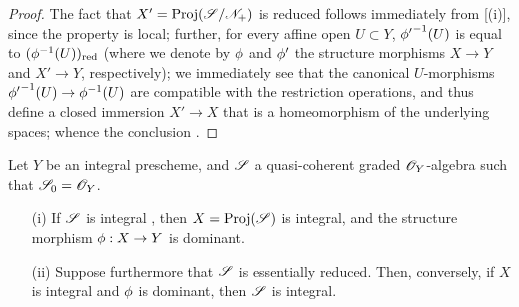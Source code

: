 \begin{proof}
The fact that $X'={\mathop{\mathrm{Proj}}\nolimits}(\mathscr{S}/\mathscr{N}_+)$ is reduced follows immediately from [(i)], since the property is local;
further, for every affine open $U\subset Y$, ${\phi'}^{-1}(U)$ is equal to $(\phi^{-1}(U))_{\mathrm{red}}$ (where we denote by $\phi$ and $\phi'$ the structure morphisms $X\to Y$ and $X'\to Y$, respectively);
we immediately see that the canonical $U$-morphisms ${\vphi'}^{-1}(U)\to\vphi^{-1}(U)$ are compatible with the restriction operations, and thus define a closed immersion $X'\to X$ that is a homeomorphism of the underlying spaces;
whence the conclusion .
\end{proof}

\begin{proposition}[3.1.14]
\label{II.3.1.14}
Let $Y$ be an integral prescheme, and $\mathscr{S}$ a quasi-coherent graded $\mathscr{O}_Y$-algebra such that $\mathscr{S}_0=\mathscr{O}_Y$.
\begin{enumerate}
  \item[(i)] If $\mathscr{S}$ is integral , then $X={\mathop{\mathrm{Proj}}\nolimits}(\mathscr{S})$ is integral, and the structure morphism $\vphi: X\to Y$ is dominant.
  \item[(ii)] Suppose furthermore that $\mathscr{S}$ is essentially reduced.
    Then, conversely, if $X$ is integral and $\phi$ is dominant, then $\mathscr{S}$ is integral.
\end{enumerate}
\end{proposition}

